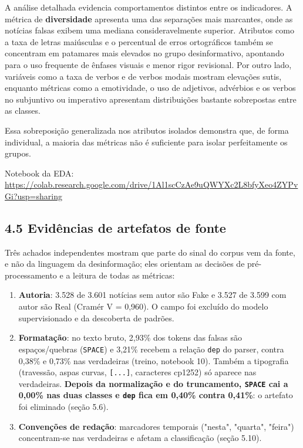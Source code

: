 \documentclass[
  brazilian,
  11pt,
]{article}
\providecommand{\tightlist}{%
  \setlength{\itemsep}{0pt}\setlength{\parskip}{0pt}}
\begin{document}
A análise detalhada evidencia comportamentos distintos entre os indicadores. A métrica de \textbf{diversidade} apresenta uma das separações mais marcantes, onde as notícias falsas exibem uma mediana consideravelmente superior. Atributos como a taxa de letras maiúsculas e o percentual de erros ortográficos também se concentram em patamares mais elevados no grupo desinformativo, apontando para o uso frequente de ênfases visuais e menor rigor revisional. Por outro lado, variáveis como a taxa de verbos e de verbos modais mostram elevações sutis, enquanto métricas como a emotividade, o uso de adjetivos, advérbios e os verbos no subjuntivo ou imperativo apresentam distribuições bastante sobrepostas entre as classes.

Essa sobreposição generalizada nos atributos isolados demonstra que, de forma individual, a maioria das métricas não é suficiente para isolar perfeitamente os grupos.

Notebook da EDA: \url{https://colab.research.google.com/drive/1Al1scCzAe9uQWYXc2L8bfyXeo4ZYPvGi?usp=sharing}

\subsection{4.5 Evidências de artefatos de fonte}\label{eviduxeancias-de-artefatos-de-fonte}

Três achados independentes mostram que parte do sinal do corpus vem da fonte, e não da linguagem da desinformação; eles orientam as decisões de pré-processamento e a leitura de todas as métricas:

\begin{enumerate}
\def\labelenumi{\arabic{enumi}.}
\tightlist
\item
  \textbf{Autoria}: 3.528 de 3.601 notícias sem autor são Fake e 3.527 de 3.599 com autor são Real (Cramér V = 0,960). O campo foi excluído do modelo supervisionado e da descoberta de padrões.
\item
  \textbf{Formatação}: no texto bruto, 2,93\% dos tokens das falsas são espaços/quebras (\texttt{SPACE}) e 3,21\% recebem a relação \texttt{dep} do parser, contra 0,38\% e 0,73\% nas verdadeiras (treino, notebook 10). Também a tipografia (travessão, aspas curvas, \texttt{{[}...{]}}, caracteres cp1252) só aparece nas verdadeiras. \textbf{Depois da normalização e do truncamento, \texttt{SPACE} cai a 0,00\% nas duas classes e \texttt{dep} fica em 0,40\% contra 0,41\%}: o artefato foi eliminado (seção 5.6).
\item
  \textbf{Convenções de redação}: marcadores temporais ("nesta", "quarta", "feira") concentram-se nas verdadeiras e afetam a classificação (seção 5.10).
\end{enumerate}
\end{document}
